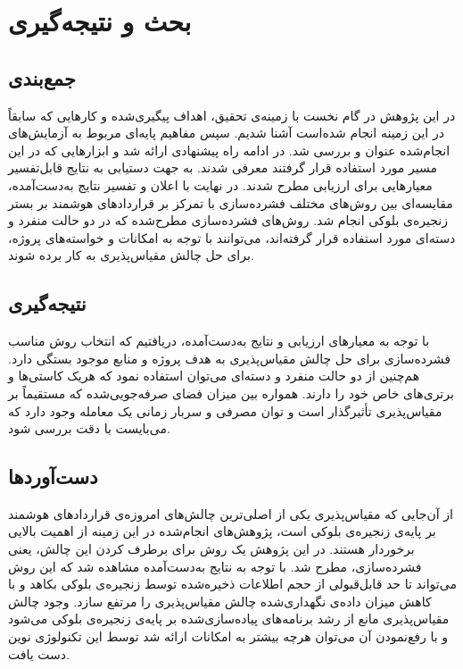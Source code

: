 \chapter{بحث و نتیجه‌گیری}
\section{جمع‌بندی}
در این پژوهش در گام نخست با زمینه‌ی تحقیق، اهداف پیگیری‌شده و کارهایی که سابقاً در این زمینه انجام شده‌است آشنا شدیم. سپس مفاهیم پایه‌ای مربوط به آزمایش‌های انجام‌شده عنوان و بررسی شد. در ادامه راه پیشنهادی ارائه شد و ابزارهایی که در این مسیر مورد استفاده قرار گرفتند معرفی شدند. به جهت دستیابی به نتایج قابل‌تفسیر معیارهایی برای ارزیابی مطرح شدند. در نهایت با اعلان و تفسیر نتایج به‌دست‌آمده، مقایسه‌ای بین روش‌های مختلف فشرده‌سازی با تمرکز بر قراردادهای هوشمند بر بستر زنجیره‌ی بلوکی انجام شد. روش‌های فشرده‌سازی مطرح‌شده که در دو حالت منفرد و دسته‌ای مورد استفاده قرار گرفته‌اند، می‌توانند با توجه به امکانات و خواسته‌های پروژه، برای حل چالش مقیاس‌پذیری به کار برده شوند.

\section{نتیجه‌گیری}
با توجه به معیارهای ارزیابی و نتایج به‌دست‌آمده، دریافتیم که انتخاب روش مناسب فشرده‌سازی برای حل چالش مقیاس‌پذیری به هدف پرو‌ژه و منابع موجود بستگی دارد. هم‌چنین از دو حالت منفرد و دسته‌ای می‌توان استفاده نمود که هریک کاستی‌ها و برتری‌های خاص خود را دارند. همواره بین میزان فضای صرفه‌جویی‌شده که مستقیماً بر مقیاس‌پذیری تأثیرگذار است و توان مصرفی و سربار زمانی یک معامله وجود دارد که می‌بایست با دقت بررسی شود.

\section{دست‌آوردها}
از آن‌جایی که مقیاس‌پذیری یکی از اصلی‌ترین چالش‌های امروزه‌ی قراردادهای هوشمند بر پایه‌ی زنجیره‌ی بلوکی است، پژوهش‌های انجام‌شده در این زمینه از اهمیت بالایی برخوردار هستند. در این پژوهش یک روش برای برطرف کردن این چالش، یعنی فشرده‌سازی، مطرح شد. با توجه به نتایج به‌دست‌آمده مشاهده شد که این روش می‌تواند تا حد قابل‌قبولی از حجم اطلاعات ذخیره‌شده توسط زنجیره‌ی بلوکی بکاهد و با کاهش میزان داده‌ی نگهداری‌شده چالش مقیاس‌پذیری را مرتفع سازد. وجود چالش مقیاس‌پذیری مانع از رشد برنامه‌های پیاده‌سازی‌شده بر پایه‌ی زنجیره‌ی بلوکی می‌شود و با رفع‌نمودن آن می‌توان هرچه بیشتر به امکانات ارائه شد توسط این تکنولوژی نوین دست یافت.

